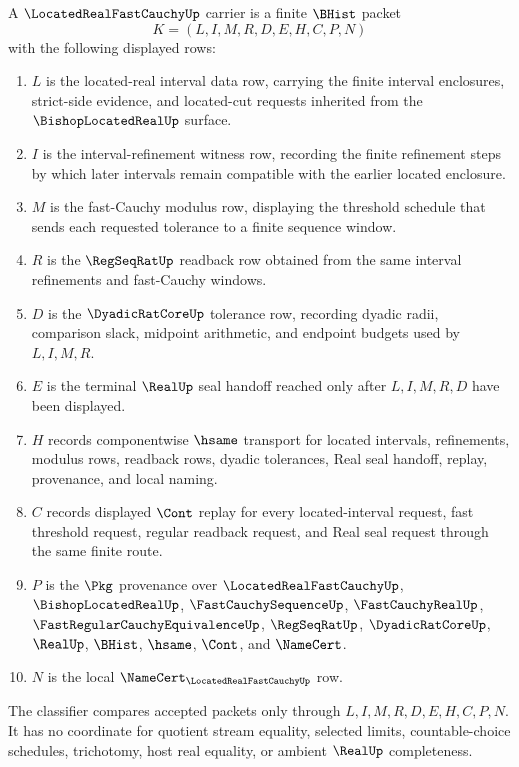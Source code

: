 \begin{definition}
\label{def:located-real-fast-cauchy-carrier}
A $\LocatedRealFastCauchyUp$ carrier is a finite $\BHist$ packet
$$
K=(L,I,M,R,D,E,H,C,P,N)
$$
with the following displayed rows:
\begin{enumerate}
\item $L$ is the located-real interval data row, carrying the finite interval enclosures, strict-side evidence, and located-cut requests inherited from the $\BishopLocatedRealUp$ surface.
\item $I$ is the interval-refinement witness row, recording the finite refinement steps by which later intervals remain compatible with the earlier located enclosure.
\item $M$ is the fast-Cauchy modulus row, displaying the threshold schedule that sends each requested tolerance to a finite sequence window.
\item $R$ is the $\RegSeqRatUp$ readback row obtained from the same interval refinements and fast-Cauchy windows.
\item $D$ is the $\DyadicRatCoreUp$ tolerance row, recording dyadic radii, comparison slack, midpoint arithmetic, and endpoint budgets used by $L,I,M,R$.
\item $E$ is the terminal $\RealUp$ seal handoff reached only after $L,I,M,R,D$ have been displayed.
\item $H$ records componentwise $\hsame$ transport for located intervals, refinements, modulus rows, readback rows, dyadic tolerances, Real seal handoff, replay, provenance, and local naming.
\item $C$ records displayed $\Cont$ replay for every located-interval request, fast threshold request, regular readback request, and Real seal request through the same finite route.
\item $P$ is the $\Pkg$ provenance over $\LocatedRealFastCauchyUp$, $\BishopLocatedRealUp$, $\FastCauchySequenceUp$, $\FastCauchyRealUp$, $\FastRegularCauchyEquivalenceUp$, $\RegSeqRatUp$, $\DyadicRatCoreUp$, $\RealUp$, $\BHist$, $\hsame$, $\Cont$, and $\NameCert$.
\item $N$ is the local $\NameCert_{\LocatedRealFastCauchyUp}$ row.
\end{enumerate}
The classifier compares accepted packets only through $L,I,M,R,D,E,H,C,P,N$. It has no coordinate for quotient stream equality, selected limits, countable-choice schedules, trichotomy, host real equality, or ambient $\RealUp$ completeness.
\end{definition}

